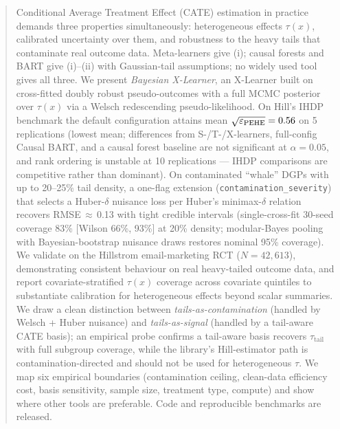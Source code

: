 \begin{abstract}
Conditional Average Treatment Effect (CATE) estimation in practice
demands three properties simultaneously: heterogeneous effects
$\tau(x)$, calibrated uncertainty over them, and robustness to the
heavy tails that contaminate real outcome data. Meta-learners
\citep{kunzel2019metalearners} give (i); causal forests and BART
give (i)--(ii) with Gaussian-tail assumptions; no widely used tool
gives all three. We present \emph{Bayesian X-Learner}, an X-Learner
built on cross-fitted doubly robust pseudo-outcomes
\citep{kennedy2020optimal} with a full MCMC posterior over $\tau(x)$
via a Welsch redescending pseudo-likelihood. On Hill's IHDP benchmark
the default configuration attains mean $\PEHE = 0.56$ on 5
replications (lowest mean; differences from S-/T-/X-learners,
full-config Causal BART, and a causal forest baseline are not
significant at $\alpha = 0.05$, and rank ordering is unstable at
10 replications --- IHDP comparisons are competitive rather than
dominant). On contaminated ``whale'' DGPs
with up to 20--25\% tail density, a one-flag extension
(\texttt{contamination\_severity}) that selects a Huber-$\delta$
nuisance loss per Huber's minimax-$\delta$ relation recovers
RMSE\,$\approx$\,0.13 with tight credible intervals (single-cross-fit
30-seed coverage 83\% [Wilson 66\%, 93\%] at 20\% density;
modular-Bayes pooling with Bayesian-bootstrap nuisance draws restores
nominal 95\% coverage). We validate on the Hillstrom
email-marketing RCT ($N = 42{,}613$), demonstrating consistent
behaviour on real heavy-tailed outcome data, and report
covariate-stratified $\tau(x)$ coverage across covariate quintiles
to substantiate calibration for heterogeneous effects beyond scalar
summaries. We draw a clean
distinction between \emph{tails-as-contamination} (handled by
Welsch + Huber nuisance) and \emph{tails-as-signal} (handled by a
tail-aware CATE basis); an empirical probe confirms a tail-aware
basis recovers $\tau_{\text{tail}}$ with full subgroup coverage,
while the library's Hill-estimator path is contamination-directed and
should not be used for heterogeneous $\tau$. We map six empirical
boundaries (contamination ceiling, clean-data efficiency cost, basis
sensitivity, sample size, treatment type, compute) and show where
other tools are preferable. Code and reproducible benchmarks are released.
\end{abstract}
